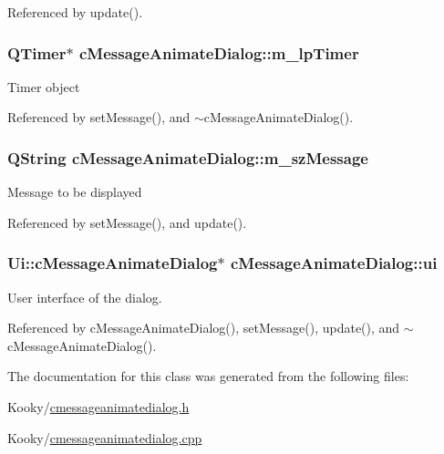 Referenced by update().

\subsubsection[{\texorpdfstring{m\+\_\+lp\+Timer}{m_lpTimer}}]{\setlength{\rightskip}{0pt plus 5cm}Q\+Timer$\ast$ c\+Message\+Animate\+Dialog\+::m\+\_\+lp\+Timer\hspace{0.3cm}{\ttfamily [protected]}}\hypertarget{classc_message_animate_dialog_a20a1bf68933e455dd515562f63976495}{}\label{classc_message_animate_dialog_a20a1bf68933e455dd515562f63976495}
Timer object 

Referenced by set\+Message(), and $\sim$c\+Message\+Animate\+Dialog().

\subsubsection[{\texorpdfstring{m\+\_\+sz\+Message}{m_szMessage}}]{\setlength{\rightskip}{0pt plus 5cm}Q\+String c\+Message\+Animate\+Dialog\+::m\+\_\+sz\+Message\hspace{0.3cm}{\ttfamily [protected]}}\hypertarget{classc_message_animate_dialog_a4ae818deecaac97f7bb1914bf2dda607}{}\label{classc_message_animate_dialog_a4ae818deecaac97f7bb1914bf2dda607}
Message to be displayed 

Referenced by set\+Message(), and update().

\subsubsection[{\texorpdfstring{ui}{ui}}]{\setlength{\rightskip}{0pt plus 5cm}Ui\+::c\+Message\+Animate\+Dialog$\ast$ c\+Message\+Animate\+Dialog\+::ui\hspace{0.3cm}{\ttfamily [private]}}\hypertarget{classc_message_animate_dialog_a9975d744633e4f1eb1604128cbfd7b50}{}\label{classc_message_animate_dialog_a9975d744633e4f1eb1604128cbfd7b50}
User interface of the dialog. 

Referenced by c\+Message\+Animate\+Dialog(), set\+Message(), update(), and $\sim$c\+Message\+Animate\+Dialog().



The documentation for this class was generated from the following files\+:\begin{DoxyCompactItemize}
\item 
Kooky/\hyperlink{cmessageanimatedialog_8h}{cmessageanimatedialog.\+h}\item 
Kooky/\hyperlink{cmessageanimatedialog_8cpp}{cmessageanimatedialog.\+cpp}\end{DoxyCompactItemize}
